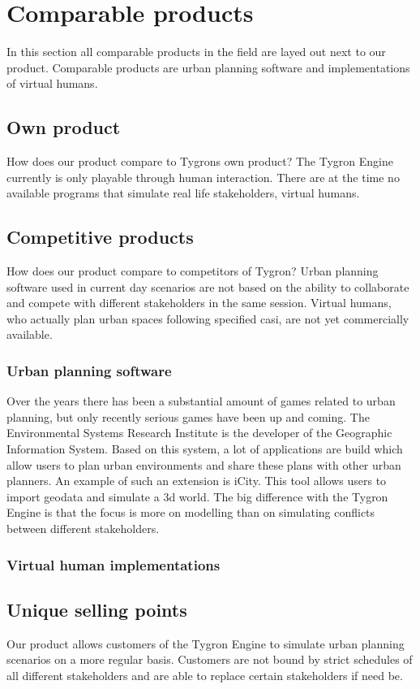 \section{Comparable products}
In this section all comparable products in the field are layed out next to our product. Comparable products are urban planning software and implementations of virtual humans.  \newline

\subsection{Own product}
How does our product compare to Tygrons own product?
The Tygron Engine currently is only playable through human interaction. There are at the time no available programs that simulate real life stakeholders, virtual humans. \newline

\subsection{Competitive products}
How does our product compare to competitors of Tygron?
Urban planning software used in current day scenarios are not based on the ability to collaborate and compete with different stakeholders in the same session. Virtual humans, who actually plan urban spaces following specified casi, are not yet commercially available. \newline

\subsubsection{Urban planning software}
Over the years there has been a substantial amount of games related to urban planning\cite{Poplin11}, but only recently serious games have been up and coming. The Environmental Systems Research Institute is the developer of the Geographic Information System\cite{GIS06}. Based on this system, a lot of applications are build which allow users to plan urban environments and share these plans with other urban planners. An example of such an extension is iCity\cite{Steve07}. This tool allows users to import geodata and simulate a 3d world. The big difference with the Tygron Engine is that the focus is more on modelling than on simulating conflicts between different stakeholders. \newline

\subsubsection{Virtual human implementations}


\subsection{Unique selling points}
Our product allows customers of the Tygron Engine to simulate urban planning scenarios on a more regular basis. Customers are not bound by strict schedules of all different stakeholders and are able to replace certain stakeholders if need be. \newline
